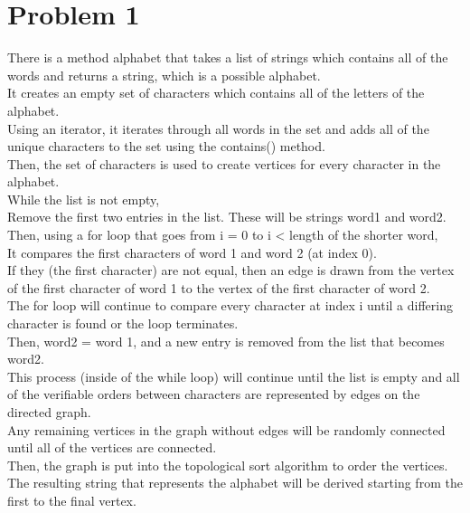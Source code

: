 \documentclass[14pt]{extarticle}
\begin{document}
\section*{Problem 1}
There is a method alphabet that takes a list of strings which contains all of the words and returns a string, which is a possible alphabet.\\
It creates an empty set of characters which contains all of the letters of the alphabet.\\
Using an iterator, it iterates through all words in the set and adds all of the unique characters to the set using the contains() method.\\
Then, the set of characters is used to create vertices for every character in the alphabet.\\
While the list is not empty, \\
Remove the first two entries in the list. These will be strings word1 and word2.\\
Then, using a for loop that goes from i = 0 to i < length of the shorter word, \\
It compares the first characters of word 1 and word 2 (at index 0). \\
If they (the first character) are not equal, then an edge is drawn from the vertex of the first character of word 1 to the vertex of the first character of word 2.\\
The for loop will continue to compare every character at index i until a differing character is found or the loop terminates.\\
Then, word2 = word 1, and a new entry is removed from the list that becomes word2.\\
This process (inside of the while loop) will continue until the list is empty and all of the verifiable orders between characters are represented by edges on the directed graph.\\
Any remaining vertices in the graph without edges will be randomly connected until all of the vertices are connected.\\
Then, the graph is put into the topological sort algorithm to order the vertices. \\
The resulting string that represents the alphabet will be derived starting from the first to the final vertex.\\
\end{document}
